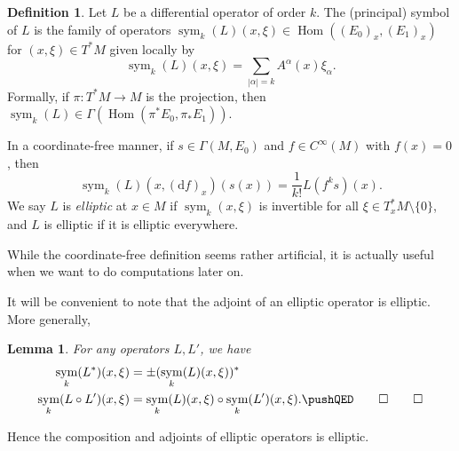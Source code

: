 \documentclass{shortart}
\newtheorem*{lemma}{Lemma}
\theoremstyle{definition}
\newtheorem*{defi}{Definition}
\newcommand\der{\mathrm{d}}
\DeclareMathOperator\Hom{Hom}
\DeclareMathOperator\symb{sym}
\begin{document}
\begin{defi}
  Let $L$ be a differential operator of order $k$. The (principal) symbol of $L$ is the family of operators $\symb_k(L)(x, \xi)\in \Hom((E_0)_x, (E_1)_x)$ for $(x, \xi) \in T^*M$ given locally by
  \[
    \symb_k (L)(x, \xi) = \sum_{|\alpha| = k} A^\alpha(x) \xi_\alpha.
  \]
  Formally, if $\pi: T^*M \to M$ is the projection, then $\symb_k(L) \in \Gamma(\Hom(\pi^* E_0, \pi_* E_1))$.

  In a coordinate-free manner, if $s \in \Gamma(M, E_0)$ and $f \in C^\infty(M)$ with $f(x) = 0$, then
  \[
    \symb_k (L)(x, (\der f)_x)(s(x)) = \frac{1}{k!} L(f^k s)(x).
  \]
  We say $L$ is \emph{elliptic} at $x \in M$ if $\symb_k(x, \xi)$ is invertible for all $\xi \in T^*_x M \setminus \{0\}$, and $L$ is elliptic if it is elliptic everywhere.
\end{defi}
While the coordinate-free definition seems rather artificial, it is actually useful when we want to do computations later on.

It will be convenient to note that the adjoint of an elliptic operator is elliptic. More generally,
\begin{lemma}
  For any operators $L, L'$, we have
  \begin{align*}
    \symb_k(L^*)(x, \xi) &= \pm (\symb_k(L)(x, \xi))^*\\
    \symb_k(L \circ L')(x, \xi) &= \symb_k(L)(x, \xi) \circ \symb_k(L')(x, \xi).\fakeqed
  \end{align*}\ifplastex\fakeqed\fi
\end{lemma}
Hence the composition and adjoints of elliptic operators is elliptic.
\end{document}
